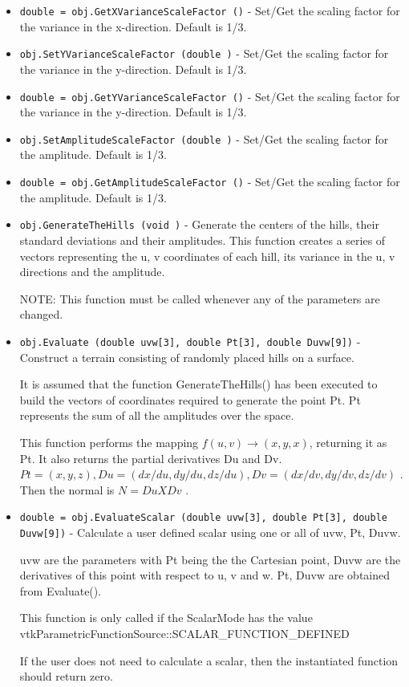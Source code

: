 \begin{itemize}
\item  \verb|double = obj.GetXVarianceScaleFactor ()| -  Set/Get the scaling factor for the variance in the x-direction. 
 Default is 1/3.

\item  \verb|obj.SetYVarianceScaleFactor (double )| -  Set/Get the scaling factor for the variance in the y-direction. 
 Default is 1/3.

\item  \verb|double = obj.GetYVarianceScaleFactor ()| -  Set/Get the scaling factor for the variance in the y-direction. 
 Default is 1/3.

\item  \verb|obj.SetAmplitudeScaleFactor (double )| -  Set/Get the scaling factor for the amplitude. 
 Default is 1/3.

\item  \verb|double = obj.GetAmplitudeScaleFactor ()| -  Set/Get the scaling factor for the amplitude. 
 Default is 1/3.

\item  \verb|obj.GenerateTheHills (void )| -  Generate the centers of the hills, their standard deviations and 
 their amplitudes. This function creates a series of vectors representing
 the u, v coordinates of each hill, its variance in the u, v directions and
 the amplitude.

 NOTE: This function must be called whenever any of the parameters are changed.

\item  \verb|obj.Evaluate (double uvw[3], double Pt[3], double Duvw[9])| -  Construct a terrain consisting of randomly placed hills on a surface. 

 It is assumed that the function GenerateTheHills() has been executed
 to build the vectors of coordinates required to generate the point Pt.
 Pt represents the sum of all the amplitudes over the space.

 This function performs the mapping $f(u,v) \rightarrow (x,y,x)$, returning it
 as Pt. It also returns the partial derivatives Du and Dv.
 $Pt = (x, y, z), Du = (dx/du, dy/du, dz/du), Dv = (dx/dv, dy/dv, dz/dv)$ .
 Then the normal is $N = Du X Dv$ .

\item  \verb|double = obj.EvaluateScalar (double uvw[3], double Pt[3], double Duvw[9])| -  Calculate a user defined scalar using one or all of uvw, Pt, Duvw.

 uvw are the parameters with Pt being the the Cartesian point, 
 Duvw are the derivatives of this point with respect to u, v and w.
 Pt, Duvw are obtained from Evaluate().

 This function is only called if the ScalarMode has the value
 vtkParametricFunctionSource::SCALAR\_FUNCTION\_DEFINED

 If the user does not need to calculate a scalar, then the 
 instantiated function should return zero. 


\end{itemize}
